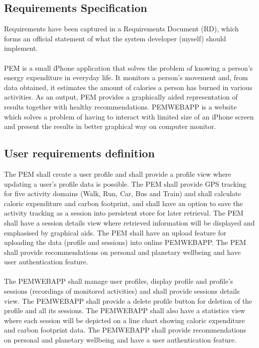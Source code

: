 \documentclass[12pt, a4paper]{report}   %
\begin{document}
\begin{enumerate}
\section{Requirements Specification}
Requirements have been captured in a Requirements Document (RD), which forms an official statement of what the system developer (myself) should implement.\\ \\
PEM is a small iPhone application that solves the problem of knowing a person's energy expenditure in everyday life. It monitors a person's movement and, from data obtained, it estimates the amount of calories a person has burned in various activities. As an output, PEM provides a graphically aided representation of results together with healthy recommendations. PEMWEBAPP is a website which solves a problem of having to interact with limited size of an iPhone screen and present the results in better graphical way on computer monitor.

\subsection{User requirements definition}
The PEM shall create a user profile and shall provide a profile view where updating a user's profile data is possible. The PEM shall provide GPS tracking for five activity domains (Walk, Run, Car, Bus and Train) and shall calculate caloric expenditure and carbon footprint, and shall have an option to save the activity tracking as a session into persistent store for later retrieval. The PEM shall have a session details view where retrieved information will be displayed and emphasised by graphical aids. The PEM shall have an upload feature for uploading the data (profile and sessions) into online PEMWEBAPP. The PEM shall provide recommendations on personal and planetary wellbeing and have user authentication feature.\\ \\
The PEMWEBAPP shall manage user profiles, display profile and profile's sessions (recordings of monitored activities) and shall provide sessions details view. The PEMWEBAPP shall provide a delete profile button for deletion of the profile and all its sessions. The PEMWEBAPP shall also have a statistics view where each session will be depicted on a line chart showing caloric expenditure and carbon footprint data. The PEMWEBAPP shall provide recommendations on personal and planetary wellbeing and have a user authentication feature.



\end{enumerate}
\end{document}
